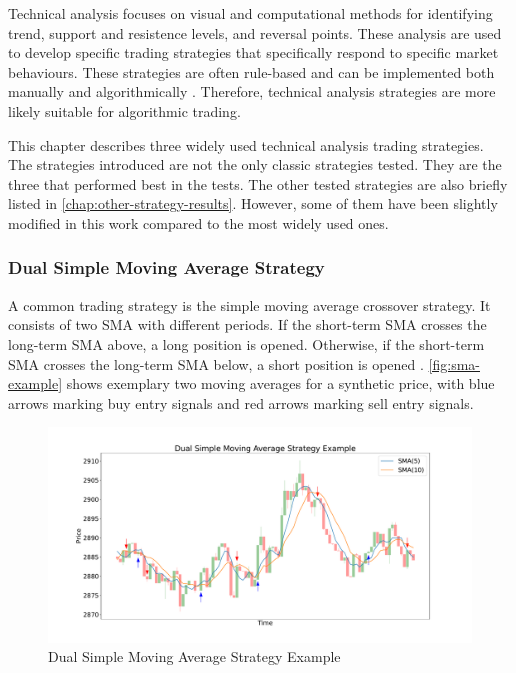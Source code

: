 Technical analysis focuses on visual and computational methods for identifying trend, support and resistence levels, and reversal points.
These analysis are used to develop specific trading strategies that specifically respond to specific market behaviours.
These strategies are often rule-based and can be implemented both manually and algorithmically \cite{ta-basics}.
Therefore, technical analysis strategies are more likely suitable for algorithmic trading.

This chapter describes three widely used technical analysis trading strategies.
The strategies introduced are not the only classic strategies tested.
They are the three that performed best in the tests.
The other tested strategies are also briefly listed in \autoref{chap:other-strategy-results}.
However, some of them have been slightly modified in this work compared to the most widely used ones.

\subsubsection{Dual Simple Moving Average Strategy}
\label{chap:sma2}

A common trading strategy is the simple moving average crossover strategy.
It consists of two SMA with different periods.
If the short-term SMA crosses the long-term SMA above, a long position is opened.
Otherwise, if the short-term SMA crosses the long-term SMA below, a short position is opened \cite{sma-strategy-basics}.
\autoref{fig:sma-example} shows exemplary two moving averages for a synthetic price, with blue arrows marking buy entry signals and red arrows marking sell entry signals.

\begin{figure}[H]
    \centering
    \includegraphics[width=\textwidth]{images/trading-strategies/sma-example}
    \caption{Dual Simple Moving Average Strategy Example}
    \label{fig:sma-example}
\end{figure}

